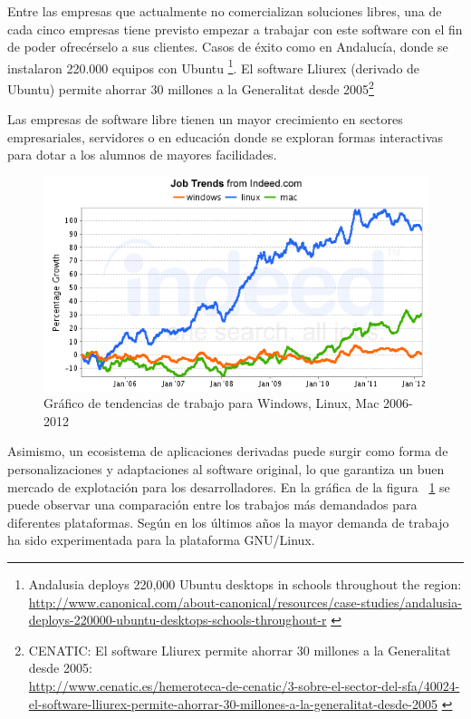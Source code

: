 Entre las empresas que actualmente no comercializan soluciones libres, una de 
cada cinco empresas tiene previsto empezar a trabajar con este software con el
fin de poder ofrecérselo a sus clientes. Casos de éxito como en Andalucía, donde
se instalaron 220.000 equipos con Ubuntu \footnote{Andalusia deploys 220,000 Ubuntu desktops in schools throughout the region:\\
\url{http://www.canonical.com/about-canonical/resources/case-studies/andalusia-deploys-220000-ubuntu-desktops-schools-throughout-r}
\label{ftn:ubuntumandalucia}}. El software Lliurex (derivado de Ubuntu) permite
ahorrar 30 millones a la Generalitat desde 2005\footnote{CENATIC: El software
Lliurex permite ahorrar 30 millones a la Generalitat desde 2005:\\
\url{http://www.cenatic.es/hemeroteca-de-cenatic/3-sobre-el-sector-del-sfa/40024-el-software-lliurex-permite-ahorrar-30-millones-a-la-generalitat-desde-2005}
\label{ftn:ubuntuliurex}}

Las empresas de software libre tienen un mayor crecimiento en sectores
empresariales, servidores o en educación donde se exploran formas
interactivas para dotar a los alumnos de mayores facilidades. 

\begin{figure}[ht]
    \begin{center}
        \includegraphics[scale=0.8]{src/img/linux-jobgraph.png}
        \caption[Gráfico de tendencias de trabajo para Windows, Linux, Mac
        2006-2012] {Gráfico de tendencias de trabajo para Windows, Linux, Mac
        2006-2012}
        \label{fig:jobs}
    \end{center}
\end{figure}

Asimismo, un ecosistema de aplicaciones derivadas puede surgir como forma de
personalizaciones y adaptaciones al software original, lo que garantiza un buen
mercado de explotación para los desarrolladores. En la gráfica de la figura
~\ref{fig:jobs} se puede observar una comparación entre los trabajos más
demandados para diferentes plataformas. Según \cite{Ind12} en los últimos años
la mayor demanda de trabajo ha sido experimentada para la plataforma GNU/Linux.

